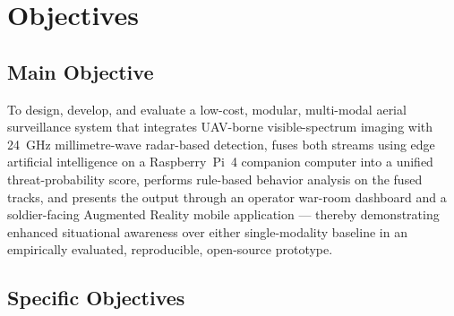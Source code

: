 \chapter{Objectives}
\label{Objectives}



\section{Main Objective}
To design, develop, and evaluate a low-cost, modular, multi-modal aerial surveillance system that integrates UAV-borne visible-spectrum imaging with 24~GHz millimetre-wave radar-based detection, fuses both streams using edge artificial intelligence on a Raspberry~Pi~4 companion computer into a unified threat-probability score, performs rule-based behavior analysis on the fused tracks, and presents the output through an operator war-room dashboard and a soldier-facing Augmented Reality mobile application --- thereby demonstrating enhanced situational awareness over either single-modality baseline in an empirically evaluated, reproducible, open-source prototype.

\section{Specific Objectives}

